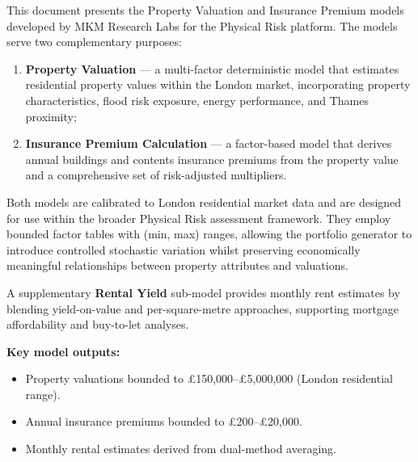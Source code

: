 \documentclass[11pt,a4paper]{article}
\begin{document}
\mkmtitlepage
\mkmlegalpage
\tableofcontents
\clearpage

\mkmexecsummary

This document presents the Property Valuation and Insurance Premium models
developed by MKM Research Labs for the Physical Risk platform. The models
serve two complementary purposes:

\begin{enumerate}[label=(\roman*)]
    \item \textbf{Property Valuation} --- a multi-factor deterministic model
          that estimates residential property values within the London market,
          incorporating property characteristics, flood risk exposure, energy
          performance, and Thames proximity;
    \item \textbf{Insurance Premium Calculation} --- a factor-based model that
          derives annual buildings and contents insurance premiums from the
          property value and a comprehensive set of risk-adjusted multipliers.
\end{enumerate}

Both models are calibrated to London residential market data and are
designed for use within the broader Physical Risk assessment framework.
They employ bounded factor tables with (min, max) ranges, allowing the
portfolio generator to introduce controlled stochastic variation whilst
preserving economically meaningful relationships between property
attributes and valuations.

A supplementary \textbf{Rental Yield} sub-model provides monthly rent
estimates by blending yield-on-value and per-square-metre approaches,
supporting mortgage affordability and buy-to-let analyses.

\textbf{Key model outputs:}
\begin{itemize}
    \item Property valuations bounded to \pounds150,000--\pounds5,000,000
          (London residential range).
    \item Annual insurance premiums bounded to \pounds200--\pounds20,000.
    \item Monthly rental estimates derived from dual-method averaging.
\end{itemize}


\mkmpurpose
\end{document}
